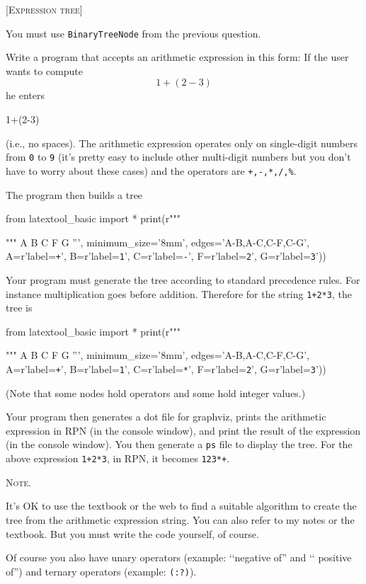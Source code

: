 \textsc{[Expression tree]}

You must use \verb!BinaryTreeNode! from the previous question.

Write a program that accepts an arithmetic expression in this form:
If the user wants to compute
\[
1 + (2 - 3)
\]
he enters
\begin{console}
1+(2-3)
\end{console}
(i.e., no spaces).
The arithmetic expression operates only on single-digit numbers 
from \verb!0! to \verb!9!
(it's pretty easy to include other multi-digit numbers but you don't
have to worry about these cases)
and the operators are \verb!+,-,*,/,%!.

The program then builds a tree
\begin{python}
from latextool_basic import *
print(r"""
\begin{center}
\end{center}
""" %
   A
  B C
   F G
''',
minimum_size='8mm',
edges='A-B,A-C,C-F,C-G',
A=r'label=\texttt{+}',
B=r'label=\texttt{1}',
C=r'label=\texttt{-}',
F=r'label=\texttt{2}',
G=r'label=\texttt{3}'))
\end{python}

Your program must generate the tree according to standard precedence
rules.
For instance multiplication goes before addition.
Therefore for the string \verb!1+2*3!, the tree is 
\begin{python}
from latextool_basic import *
print(r"""
\begin{center}
\end{center}
""" %
   A
  B C
   F G
''',
minimum_size='8mm',
edges='A-B,A-C,C-F,C-G',
A=r'label=\texttt{+}',
B=r'label=\texttt{1}',
C=r'label=\texttt{*}',
F=r'label=\texttt{2}',
G=r'label=\texttt{3}'))
\end{python}
(Note that some nodes hold operators and some hold integer values.)

Your program then generates a dot file for graphviz,
prints the arithmetic expression in RPN (in the console window), and
print the result of the expression (in the console window).
You then generate a \verb!ps! file to display the tree.
For the above expression \verb!1+2*3!, in RPN, it becomes
\verb!123*+!.

\textsc{Note.}
\begin{tightlist}
\item It's OK to use the textbook or the web to find a suitable algorithm to
create the tree from the arithmetic expression string.
You can also refer to my notes or the textbook.
But you must write the code yourself, of course.
\item Of course you also have unary operators (example: \lq\lq negative of'' and \lq\lq
positive of'')
and ternary operators (example: \texttt{(:?)}).
\end{tightlist}

